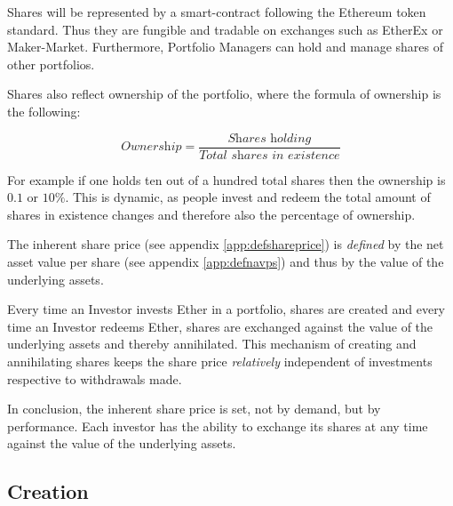 \documentclass[9pt,oneside]{amsart}
\theoremstyle{plain}
\begin{document}
\begin{multicols}{2}
    Shares will be represented by a smart-contract following the Ethereum token standard\cite{tokenstandard}. Thus they are fungible and tradable on exchanges such as EtherEx\cite{etherex} or Maker-Market\cite{maker-market}. Furthermore, Portfolio Managers can hold and manage shares of other portfolios.
    
    Shares also reflect ownership of the portfolio, where the formula of ownership is the following:
    
    \begin{equation}
        \textit{Ownership} = \frac{\textit{Shares holding}}{\textit{Total shares in existence}}
    \end{equation}
    
    For example if one holds ten out of a hundred total shares then the ownership is $0.1$ or $10\%$. This is dynamic, as people invest and redeem the total amount of shares in existence changes and therefore also the percentage of ownership. 
    
    The inherent share price (see appendix \ref{app:defshareprice}) is \textit{defined} by the net asset value per share (see appendix \ref{app:defnavps}) and thus by the value of the underlying assets.
    
    Every time an Investor invests Ether in a portfolio, shares are created and every time an Investor redeems Ether, shares are exchanged against the value of the underlying assets and thereby annihilated. This mechanism of creating and annihilating shares keeps the share price \textit{relatively} independent of investments respective to withdrawals made.
    
    In conclusion, the inherent share price is set, not by demand, but by performance. Each investor has the ability to exchange its shares at any time against the value of the underlying assets. 
    
    \subsection{Creation}\label{sub:creation}
    

\end{multicols}
\end{document}

